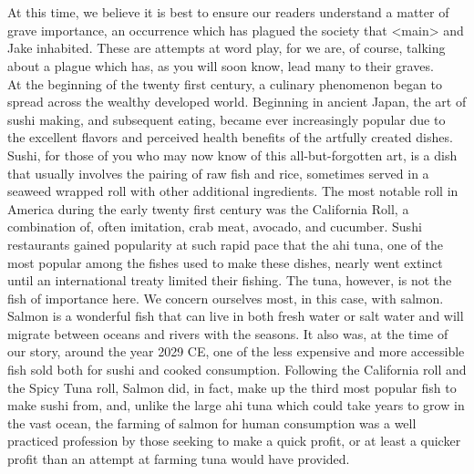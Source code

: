 \documentclass[12pt,openany]{memoir}
\begin{document}
\chapter{}

At this time, we believe it is best to ensure our readers understand a matter of grave importance, an occurrence which has plagued the society that <main> and Jake inhabited.
These are attempts at word play, for we are, of course, talking about a plague which has, as you will soon know, lead many to their graves.
\\

At the beginning of the twenty first century, a culinary phenomenon began to spread across the wealthy developed world.
Beginning in ancient Japan, the art of sushi making, and subsequent eating, became ever increasingly popular due to the excellent flavors and perceived health benefits of the artfully created dishes.
Sushi, for those of you who may now know of this all-but-forgotten art, is a dish that usually involves the pairing of raw fish and rice, sometimes served in a seaweed wrapped roll with other additional ingredients.
The most notable roll in America during the early twenty first century was the California Roll, a combination of, often imitation, crab meat, avocado, and cucumber.
Sushi restaurants gained popularity at such rapid pace that the ahi tuna, one of the most popular among the fishes used to make these dishes, nearly went extinct until an international treaty limited their fishing.
The tuna, however, is not the fish of importance here.
We concern ourselves most, in this case, with salmon.
\\

Salmon is a wonderful fish that can live in both fresh water or salt water and will migrate between oceans and rivers with the seasons.
It also was, at the time of our story, around the year 2029 CE, one of the less expensive and more accessible fish sold both for sushi and cooked consumption.
Following the California roll and the Spicy Tuna roll, Salmon did, in fact, make up the third most popular fish to make sushi from, and, unlike the large ahi tuna which could take years to grow in the vast ocean, the farming of salmon for human consumption was a well practiced profession by those seeking to make a quick profit, or at least a quicker profit than an attempt at farming tuna would have provided.
\\
\end{document}
